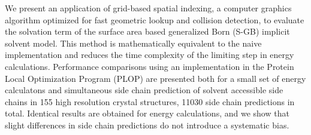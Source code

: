 We present an application of grid-based spatial indexing, a computer graphics algorithm optimized for fast geometric lookup and collision detection, to evaluate the solvation term of the surface area based generalized Born (S-GB) implicit solvent model.
This method is mathematically equivalent to the naive implementation and reduces the time complexity of the limiting step in energy calculations.
Performance comparisons using an implementation in the Protein Local Optimization Program (PLOP) are presented both for a small set of energy calculatons and simultaneous side chain prediction of solvent accessible side chains in 155 high resolution crystal structures, 11030 side chain predictions in total.
Identical results are obtained for energy calculations, and we show that slight differences in side chain predictions do not introduce a systematic bias.

